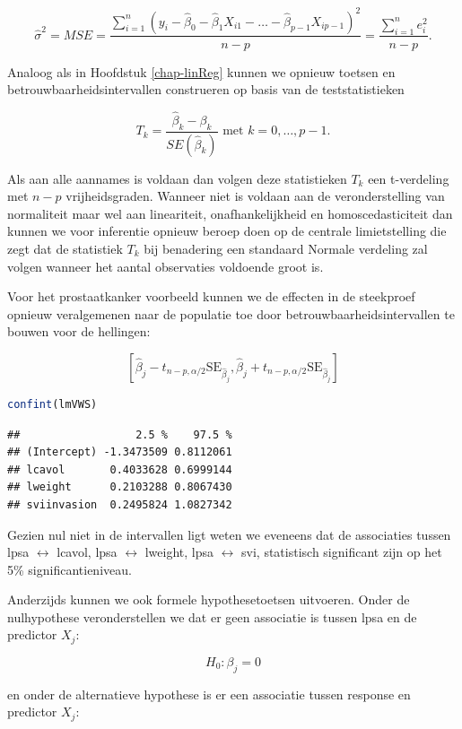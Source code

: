 \documentclass[
  12pt,dutch,coursenotes]{book}
\theoremstyle{definition}
\theoremstyle{definition}
\theoremstyle{definition}
\theoremstyle{definition}
\theoremstyle{remark}
\begin{document}
\[\hat\sigma^2=MSE=\frac{\sum\limits_{i=1}^n \left(y_i-\hat\beta_0-\hat\beta_1 X_{i1}-\ldots-\hat\beta_{p-1} X_{ip-1}\right)^2}{n-p}=\frac{\sum\limits_{i=1}^n e^2_i}{n-p}.\]

Analoog als in Hoofdstuk \ref{chap-linReg} kunnen we opnieuw toetsen en betrouwbaarheidsintervallen construeren op basis van de teststatistieken

\[T_k=\frac{\hat{\beta}_k-\beta_k}{SE(\hat{\beta}_k)} \text{ met } k=0, \ldots, p-1.\]

Als aan alle aannames is voldaan dan volgen deze statistieken \(T_k\) een t-verdeling met \(n-p\) vrijheidsgraden.
Wanneer niet is voldaan aan de veronderstelling van normaliteit maar wel aan lineariteit, onafhankelijkheid en homoscedasticiteit dan kunnen we voor inferentie opnieuw beroep doen op de centrale limietstelling die zegt dat de statistiek \(T_k\) bij benadering een standaard Normale verdeling zal volgen wanneer het aantal observaties voldoende groot is.

Voor het prostaatkanker voorbeeld kunnen we de effecten in de steekproef opnieuw veralgemenen naar de populatie toe door betrouwbaarheidsintervallen te bouwen voor de hellingen:

\[
[\hat\beta_j - t_{n-p,\alpha/2} \text{SE}_{\hat\beta_j},\hat\beta_j + t_{n-p,\alpha/2} \text{SE}_{\hat\beta_j}]
\]

\begin{lstlisting}[language=R]
confint(lmVWS)
\end{lstlisting}

\begin{lstlisting}
##                  2.5 %    97.5 %
## (Intercept) -1.3473509 0.8112061
## lcavol       0.4033628 0.6999144
## lweight      0.2103288 0.8067430
## sviinvasion  0.2495824 1.0827342
\end{lstlisting}

Gezien nul niet in de intervallen ligt weten we eveneens dat de associaties tussen lpsa \(\leftrightarrow\) lcavol, lpsa \(\leftrightarrow\) lweight, lpsa \(\leftrightarrow\) svi, statistisch significant zijn op het 5\% significantieniveau.

Anderzijds kunnen we ook formele hypothesetoetsen uitvoeren. Onder de nulhypothese veronderstellen we dat er geen associatie is tussen lpsa en de predictor \(X_j\):

\[H_0: \beta_j=0\]

en onder de alternatieve hypothese is er een associatie tussen response en predictor \(X_j\):
\end{document}
